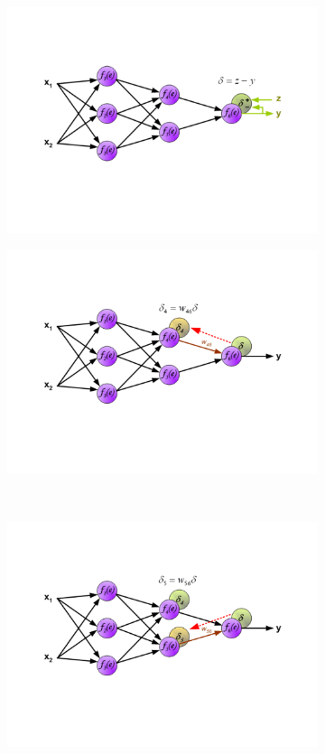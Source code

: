 \documentclass[a4paper,12pt]{report}
\begin{document}
 \begin{figure}[h!]
  \centering
  \begin{subfigure}[b]{0.45\linewidth}
   \includegraphics[width=\linewidth]{BackPropa.png}
  \end{subfigure}
  \begin{subfigure}[b]{0.45\linewidth}
   \includegraphics[width=\linewidth]{BackPropb.png}
  \end{subfigure}
  \\
  \begin{subfigure}[b]{0.45\linewidth}
   \includegraphics[width=\linewidth]{BackPropc.png}

\end{subfigure}
\end{figure}
\end{document}
